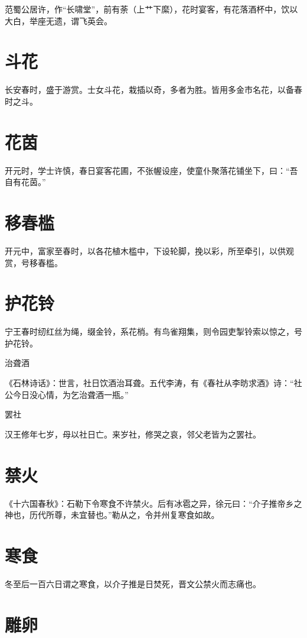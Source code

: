\documentclass[a4paper,12pt,UTF8,twoside]{ctexbook}
\begin{document}
范蜀公居许，作“长啸堂”，前有荼（上艹下縻），花时宴客，有花落酒杯中，饮以大白，举座无遗，谓飞英会。

	\section{斗花}

长安春时，盛于游赏。士女斗花，栽插以奇，多者为胜。皆用多金市名花，以备春时之斗。

	\section{花茵}

开元时，学士许慎，春日宴客花圃，不张幄设座，使童仆聚落花铺坐下，曰：“吾自有花茵。”

	\section{移春槛}

开元中，富家至春时，以各花植木槛中，下设轮脚，挽以彩，所至牵引，以供观赏，号移春槛。

	\section{护花铃}

宁王春时纫红丝为绳，缀金铃，系花梢。有鸟雀翔集，则令园吏掣铃索以惊之，号护花铃。

治聋酒

《石林诗话》：世言，社日饮酒治耳聋。五代李涛，有《春社从李昉求酒》诗：“社公今日没心情，为乞治聋酒一瓶。”

罢社

汉王修年七岁，母以社日亡。来岁社，修哭之哀，邻父老皆为之罢社。

	\section{禁火}

《十六国春秋》：石勒下令寒食不许禁火。后有冰雹之异，徐元曰：“介子推帝乡之神也，历代所尊，未宜替也。”勒从之，令并州复寒食如故。

	\section{寒食}

冬至后一百六日谓之寒食，以介子推是日焚死，晋文公禁火而志痛也。

	\section{雕卵}
\end{document}
